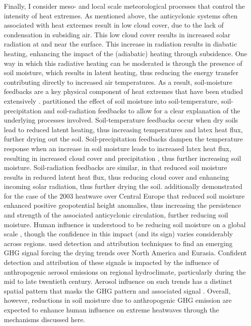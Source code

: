   Finally, I consider meso- and local scale meteorological processes that control the intensity of heat extremes. As mentioned above, the anticyclonic systems often associated with heat extremes result in low cloud cover, due to the lack of condensation in subsiding air. This low cloud cover results in increased solar radiation at and near the surface. This increase in radiation results in diabatic heating, enhancing the impact of the (adiabatic) heating through subsidence. One way in which this radiative heating can be moderated is through the presence of soil moisture, which results in latent heating, thus reducing the energy transfer contributing directly to increased air temperatures. As a result, soil-moisture feedbacks are a key physical component of heat extremes that have been studied extensively \citep{horton_review_2016,wehrli_identifying_2019,zeppetello_physics_2022,vogel_varying_2018,fischer_contribution_2007,fischer_soil_2007,miralles_mega-heatwave_2014,sousa_distinct_2020}. \citet{vogel_varying_2018} partitioned the effect of soil moisture into soil-temperature, soil-precipitation and soil-radiation feedbacks to allow for a clear explanation of the underlying processes involved. Soil-temperature feedbacks occur when dry soils lead to reduced latent heating, thus increasing temperatures and latex heat flux, further drying out the soil. Soil-precipitation feedbacks dampen the temperature response when an increase in soil moisture leads to increased latex heat flux, resulting in increased cloud cover and precipitation \citep{dingley_forcing_2021}, thus further increasing soil moisture. Soil-radiation feedbacks are similar, in that reduced soil moisture results in reduced latent heat flux, thus reducing cloud cover and enhancing incoming solar radiation, thus further drying the soil. \citet{fischer_soil_2007} additionally demonstrated for the case of the 2003 heatwave over Central Europe that reduced soil moisture enhanced positive geopotential height anomalies, thus increasing the persistence and strength of the associated anticyclonic circulation, further reducing soil moisture. Human influence is understood to be reducing soil moisture on a global scale \citep{gu_attribution_2019}, though the confidence in this impact (and its sign) varies considerably across regions. \citet{marvel_twentieth-century_2019} used detection and attribution techniques to find an emerging GHG signal forcing the drying trends over North America and Eurasia. Confident detection and attribution of these signals is impacted by the influence of anthropogenic aerosol emissions on regional hydroclimate, particularly during the mid to late twentieth century. Aerosol influence on such trends has a distinct spatial pattern that masks the GHG pattern and associated signal \citep{bonfils_human_2020}. Overall, however, reductions in soil moisture due to anthropogenic GHG emission are expected to enhance human influence on extreme heatwaves through the mechanisms discussed here.

